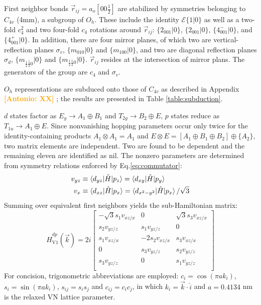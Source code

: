 \documentclass[twocolumn,showpacs,preprintnumbers,superscriptaddress,prb,floatfix,aps,10pt]{revtex4-1}
\newcommand{\abmei}[1]{\textcolor{orange}{ \bf [Antonio: #1] }}
\newcommand*{\ham}{\hat{H}}
\newcommand*{\id}{\mathcal{E}}
\newcommand*{\bondvec}{\vec{r}_{ij}}
\newcommand{\seitz}[2]{\{#1|#2\}}
\begin{document}
First neighbor bonds $\bondvec = a_o[00\frac{1}{2}]$ are stabilized by symmetries belonging to $C_{4v}$ (4mm), a subgroup of $O_h$. These include the identity $\id \seitz{1}{0}$ as well as a two-fold $c_{4}^2$ and two four-fold $c_{4}$ rotations around $\bondvec$: $\seitz{2_{001}}{0}$, $\seitz{2_{001}}{0}$, $\seitz{4^-_{001}}{0}$, and $\seitz{4^+_{001}}{0}$. In addition, there are four mirror planes, of which two are vertical-reflection planes $\sigma_v$, $\seitz{m_{010}}{0}$ and $\seitz{m_{100}}{0}$, and two are diagonal reflection planes $\sigma_d$, $\seitz{m_{\frac{1}{2}\bar{\frac{1}{2}}0}}{0}$ and $\seitz{m_{\frac{1}{2}\frac{1}{2}0}}{0}$. $\bondvec$ resides at the intersection of mirror plans. The generators of the group are $c_4$ and $\sigma_v$. 

$O_h$ representations are subduced onto those of $C_{4v}$ as described in Appendix \abmei{XX}; the results are presented in Table \ref{table:subduction}. 



$d$ states factor as $E_g \rightarrow A_1 \oplus B_1$ and $T_{2g} \rightarrow B_2 \oplus E$, $p$ states reduce as $T_{1u} \rightarrow A_1 \oplus E$. Since nonvanishing hopping parameters occur only twice for the identity-containing products $A_1 \otimes A_1 = A_1$ and $E \otimes E = [ A_1 \oplus B_1 \oplus B_2 ] \oplus \{ A_2 \}$, two matrix elements are independent. Two are found to be dependent and the remaining eleven are identified as nil. The nonzero parameters are determined from symmetry relations enforced by Eq.\ref{eq:commutator}:
%
\begin{align}
v_{yz} &
\equiv \braket{d_{yz} | \ham | p_z} 
= \braket{d_{xy} | \ham | p_y} \\
v_{x} &
\equiv \braket{d_{xz} | \ham | p_x} 
= \braket{d_{x^2-y^2} | \ham | p_x} / \sqrt{3}
\end{align}
%
Summing over equivalent first neighbors yields the sub-Hamiltonian matrix:
%
\begin{equation}
\ham_{\textrm{V1}}^{dp}(\vec{k}) = 2i
\begin{bmatrix}
-\sqrt{3} s_1 v_{xz/x} & 0              & \sqrt{3} s_3 v_{xz/x}  \\
 s_2 v_{yz/z}          &  s_1 v_{yz/z}  &      0                 \\
 s_1 v_{xz/x}          &-2 s_2 v_{xz/x} &  s_3 v_{xz/x}          \\
      0                &  s_3 v_{yz/z}  &  s_2 v_{yz/z}          \\
 s_3 v_{yz/z}          & 0              &  s_1 v_{yz/z}          \\
\end{bmatrix}
\end{equation}
%
For concision, trigonometric abbreviations are employed: $c_i = \cos(\pi a k_i)$, $s_i = \sin(\pi a k_i)$, $s_{ij} = s_i s_j$ and $c_{ij} = c_i c_j$, in which $k_i = \vec{k}\cdot\hat{i}$ and $a = 0.4134$ nm is the relaxed VN lattice parameter. 
\end{document}
